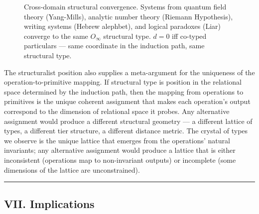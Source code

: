 \documentclass[12pt,a4paper]{article}
\begin{document}
\begin{figure}[htbp]
{
}

\caption{Cross-domain structural convergence. Systems from quantum field theory (Yang-Mills), analytic number theory (Riemann Hypothesis), writing systems (Hebrew alephbet), and logical paradoxes (Liar) converge to the same $O_\infty$ structural type. $d = 0$ iff co-typed particulars --- same coordinate in the induction path, same structural type.}
\label{fig:cross-domain-convergence}
\end{figure}

The structuralist position also supplies a meta-argument for the uniqueness of the operation-to-primitive mapping. If structural type is position in the relational space determined by the induction path, then the mapping from operations to primitives is the unique coherent assignment that makes each operation's output correspond to the dimension of relational space it probes. Any alternative assignment would produce a different structural geometry --- a different lattice of types, a different tier structure, a different distance metric. The crystal of types we observe is the unique lattice that emerges from the operations' natural invariants; any alternative assignment would produce a lattice that is either inconsistent (operations map to non-invariant outputs) or incomplete (some dimensions of the lattice are unconstrained).

\begin{center}
\rule{0.5\textwidth}{0.4pt}
\end{center}

\subsection{VII. Implications}
\end{document}
